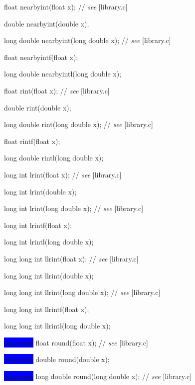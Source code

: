 \documentclass[prd,twocolumn,amsmath,amssymb,nofootinbib,eqsecnum]{revtex4-1}
\newcommand{\oldhighlight}[1]{\colorbox{blue}{\!\!\!\! #1}}
\newcommand{\stdcomment}[1]{{// {\it see} [#1]}}
\begin{document}
{\vspace{2ex}


float nearbyint(float x); \stdcomment{library.c}

double nearbyint(double x);

long double nearbyint(long double x); \stdcomment{library.c}

 float nearbyintf(float x);

 long double nearbyintl(long double x);

\vspace{2ex}


 float rint(float x); \stdcomment{library.c}

 double rint(double x);

long double rint(long double x); \stdcomment{library.c}

 float rintf(float x);

 long double rintl(long double x);

\vspace{2ex}


long int lrint(float x); \stdcomment{library.c}

 long int lrint(double x);

long int lrint(long double x); \stdcomment{library.c}

 long int lrintf(float x);

long int lrintl(long double x);

\vspace{2ex}


long long int llrint(float x); \stdcomment{library.c}

long long int llrint(double x);

long long int llrint(long double x); \stdcomment{library.c}

long long int llrintf(float x);

long long int llrintl(long double x);

\vspace{2ex}


\oldhighlight{constexpr} float round(float x); \stdcomment{library.c}

\oldhighlight{constexpr} double round(double x);

\oldhighlight{constexpr} long double round(long double x); \stdcomment{library.c}

}
\end{document}
